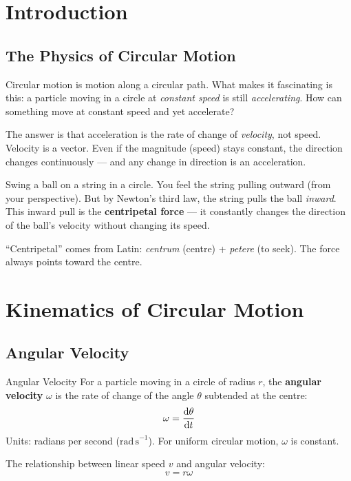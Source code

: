 \documentclass[12pt, a4paper]{book}
\begin{document}
\section{Introduction}

\subsection{The Physics of Circular Motion}

Circular motion is motion along a circular path. What makes it fascinating is this: a particle moving in a circle at \emph{constant speed} is still \emph{accelerating}. How can something move at constant speed and yet accelerate?

The answer is that acceleration is the rate of change of \emph{velocity}, not speed. Velocity is a vector. Even if the magnitude (speed) stays constant, the direction changes continuously --- and any change in direction is an acceleration.

\begin{intuitionbox}
Swing a ball on a string in a circle. You feel the string pulling outward (from your perspective). But by Newton's third law, the string pulls the ball \emph{inward}. This inward pull is the \textbf{centripetal force} --- it constantly changes the direction of the ball's velocity without changing its speed.

``Centripetal'' comes from Latin: \emph{centrum} (centre) + \emph{petere} (to seek). The force always points toward the centre.
\end{intuitionbox}

\section{Kinematics of Circular Motion}

\subsection{Angular Velocity}

\begin{defn}{Angular Velocity}{}
For a particle moving in a circle of radius $r$, the \textbf{angular velocity} $\omega$ is the rate of change of the angle $\theta$ subtended at the centre:
\[
  \omega = \dv{\theta}{t}
\]
Units: radians per second ($\mathrm{rad\,s}^{-1}$). For uniform circular motion, $\omega$ is constant.

The relationship between linear speed $v$ and angular velocity:
\[
  v = r\omega
\]
\end{defn}
\end{document}
